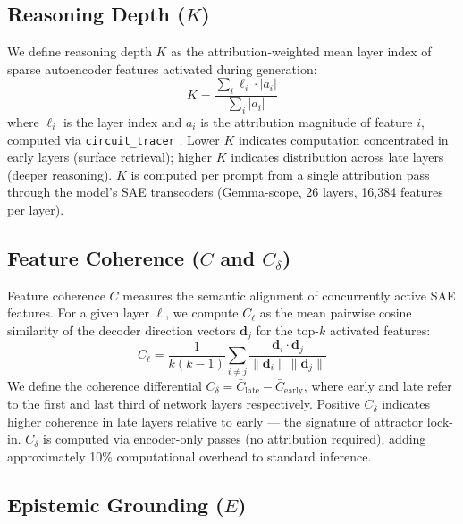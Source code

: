 \documentclass{article}
\begin{document}
\subsection{Reasoning Depth ($K$)}

We define reasoning depth $K$ as the attribution-weighted mean layer index of sparse autoencoder features activated during generation:
\begin{equation}
K = \frac{\sum_{i} \ell_i \cdot |a_i|}{\sum_{i} |a_i|}
\end{equation}
where $\ell_i$ is the layer index and $a_i$ is the attribution magnitude of feature $i$, computed via \texttt{circuit\_tracer} \citep{rodabaugh2026fathom}. Lower $K$ indicates computation concentrated in early layers (surface retrieval); higher $K$ indicates distribution across late layers (deeper reasoning). $K$ is computed per prompt from a single attribution pass through the model's SAE transcoders (Gemma-scope, 26 layers, 16{,}384 features per layer).

\subsection{Feature Coherence ($C$ and $C_\delta$)}

Feature coherence $C$ measures the semantic alignment of concurrently active SAE features. For a given layer $\ell$, we compute $C_\ell$ as the mean pairwise cosine similarity of the decoder direction vectors $\mathbf{d}_j$ for the top-$k$ activated features:
\begin{equation}
C_\ell = \frac{1}{k(k-1)} \sum_{i \neq j} \frac{\mathbf{d}_i \cdot \mathbf{d}_j}{\|\mathbf{d}_i\| \|\mathbf{d}_j\|}
\end{equation}
We define the coherence differential $C_\delta = \bar{C}_{\text{late}} - \bar{C}_{\text{early}}$, where early and late refer to the first and last third of network layers respectively. Positive $C_\delta$ indicates higher coherence in late layers relative to early --- the signature of attractor lock-in. $C_\delta$ is computed via encoder-only passes (no attribution required), adding approximately 10\% computational overhead to standard inference.

\subsection{Epistemic Grounding ($E$)}
\end{document}
